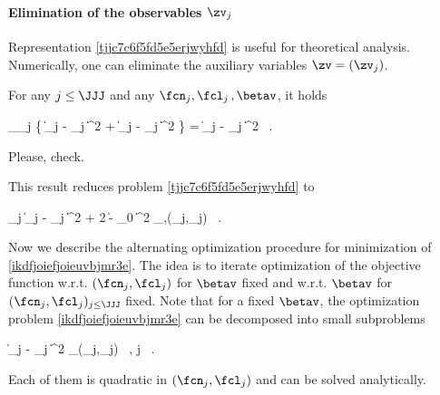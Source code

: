 \paragraph{Elimination of the observables \( \zv_{j} \)}
Representation \eqref{tjjc7c6f5fd5e5erjwyhfd} is useful for theoretical analysis.
Numerically, one can eliminate the auxiliary variables \( \zv = (\zv_{j}) \).

\begin{lemma}
For any \( j \leq \JJJ \) and any
\( \fcn_{j},\fcl_{j} \, , \betav \), it holds
\begin{EQA}[c]
	\inf_{\zv_{j}} \Bigl\{ \| \Imav_{j} - \imav_{j} \|^{2} 
	+ \Bigl\| \imav_{j} - \KSe_{j}  \Bigr\|^{2} \Bigr\} 
	=
	 \Bigl\| \Imav_{j} - \KSe_{j}  \Bigr\|^{2}
	\, .
\end{EQA}
\end{lemma}

{\color{blue} Please, check.}

This result reduces problem \eqref{tjjc7c6f5fd5e5erjwyhfd} to
\begin{EQA}[c]
	\sum_{j} \Bigl\| \Imav_{j} - \KSe_{j}  \Bigr\|^{2} + 2 \lambda \| \betav - \betav_{0} \|^{2}
	\to
	\min_{\betav,(\fcn_{j},\fcl_{j})}
	\, .
\label{ikdfjoiefjoieuvbjmr3e}
\end{EQA}

Now we describe the alternating optimization procedure for minimization of \eqref{ikdfjoiefjoieuvbjmr3e}.
The idea is to iterate optimization of the objective function w.r.t. \( (\fcn_{j},\fcl_{j}) \) for \( \betav \) fixed
and w.r.t. \( \betav \) for \( (\fcn_{j},\fcl_{j})_{j \leq \JJJ} \) fixed.
Note that for a fixed \( \betav \), the optimization problem \eqref{ikdfjoiefjoieuvbjmr3e}
can be decomposed into small subproblems 
\begin{EQA}[c]
	\Bigl\| \Imav_{j} - \KSe_{j}  \Bigr\|^{2}
	\to \min_{(\fcn_{j},\fcl_{j})}
	\, ,
	\qquad
	j \leq \JJJ
	\, .
\end{EQA}
Each of them is quadratic in \( (\fcn_{j},\fcl_{j}) \) and can be solved analytically.

